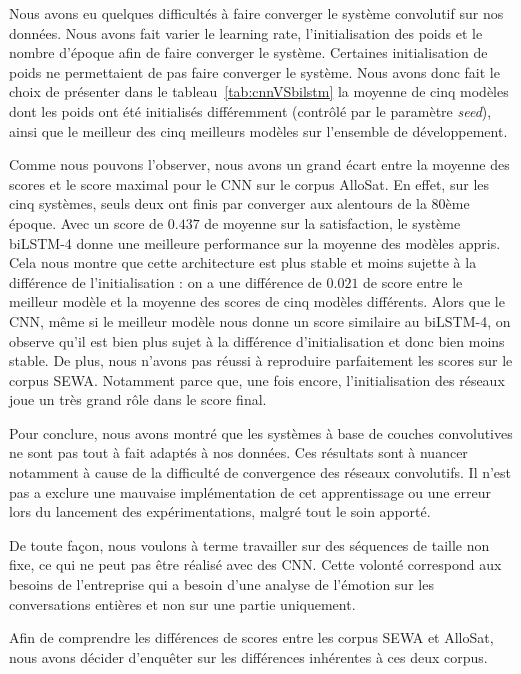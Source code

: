Nous avons eu quelques difficultés à faire converger le système convolutif sur nos données. Nous avons fait varier le learning rate, l'initialisation des poids et le nombre d'époque afin de faire converger le système. Certaines initialisation de poids ne permettaient de pas faire converger le système. Nous avons donc fait le choix de présenter dans le tableau~\ref{tab:cnnVSbilstm} la moyenne de cinq modèles dont les poids ont été initialisés différemment (contrôlé par le paramètre \textit{seed}), ainsi que le meilleur des cinq meilleurs modèles sur l'ensemble de développement.



Comme nous pouvons l'observer, nous avons un grand écart entre la moyenne des scores et le score maximal pour le CNN sur le corpus AlloSat. En effet, sur les cinq systèmes, seuls deux ont finis par converger aux alentours de la 80ème époque. Avec un score de $0.437$ de moyenne sur la satisfaction, le système biLSTM-4 donne une meilleure performance sur la moyenne des modèles appris. Cela nous montre que cette architecture est plus stable et moins sujette à la différence de l'initialisation : on a une différence de $0.021$ de score entre le meilleur modèle et la moyenne des scores de cinq modèles différents. Alors que le CNN, même si le meilleur modèle nous donne un score similaire au biLSTM-4, on observe qu'il est bien plus sujet à la différence d'initialisation et donc bien moins stable. De plus, nous n'avons pas réussi à reproduire parfaitement les scores sur le corpus SEWA. Notamment parce que, une fois encore, l'initialisation des réseaux joue un très grand rôle dans le score final.

Pour conclure, nous avons montré que les systèmes à base de couches convolutives ne sont pas tout à fait adaptés à nos données. Ces résultats sont à nuancer notamment à cause de la difficulté de convergence des réseaux convolutifs. Il n'est pas a exclure une mauvaise implémentation de cet apprentissage ou une erreur lors du lancement des expérimentations, malgré tout le soin apporté.

De toute façon, nous voulons à terme travailler sur des séquences de taille non fixe, ce qui ne peut pas être réalisé avec des CNN. Cette volonté correspond aux besoins de l'entreprise qui a besoin d'une analyse de l'émotion sur les conversations entières et non sur une partie uniquement.

Afin de comprendre les différences de scores entre les corpus SEWA et AlloSat, nous avons décider d'enquêter sur les différences inhérentes à ces deux corpus.

